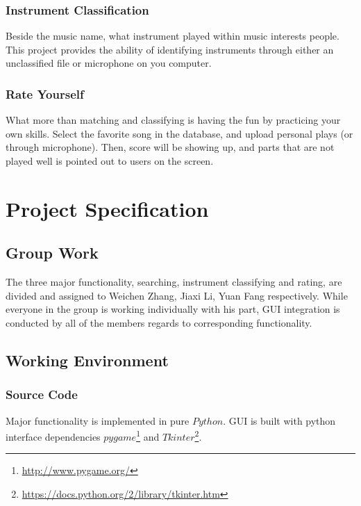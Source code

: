 \documentclass[whitelogo,12pt]{tudelft-report}
\begin{document}
\subsection{Instrument Classification}
Beside the music name, what instrument played within music interests people. This project provides the ability of identifying instruments through either an unclassified file or microphone on you computer.

\subsection{Rate Yourself}
What more than matching and classifying is having the fun by practicing your own skills. Select the favorite  song in the database, and upload personal plays (or through microphone). Then, score will be showing up, and parts that are not played well is pointed out to users on the screen.

\chapter{Project Specification}
\section{Group Work}
The three major functionality, searching, instrument classifying and rating, are divided and assigned to Weichen Zhang, Jiaxi Li, Yuan Fang respectively. While everyone in the group is working individually with his part, GUI integration is conducted by all of the members regards to corresponding functionality.

\section{Working Environment}
\subsection{Source Code}
Major functionality is implemented in pure $Python$. GUI is built with python interface dependencies $pygame$\footnote{\url{http://www.pygame.org/}} and $Tkinter$\footnote{\url{https://docs.python.org/2/library/tkinter.htm}}.
\end{document}
